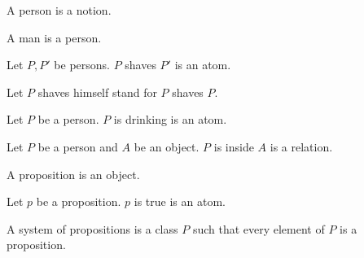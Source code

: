 \begin{forthel}
\end{forthel}

\begin{forthel}
  \begin{signature*}
    A person is a notion.
  \end{signature*}

  \begin{signature*}
    A man is a person.
  \end{signature*}

  \begin{signature*}
    Let $P, P'$ be persons.
    $P$ shaves $P'$ is an atom.
  \end{signature*}

  Let $P$ shaves himself stand for $P$ shaves $P$.

  \begin{signature*}
    Let $P$ be a person.
    $P$ is drinking is an atom.
  \end{signature*}

  \begin{signature*}
    Let $P$ be a person and $A$ be an object.
    $P$ is inside $A$ is a relation.
  \end{signature*}

  \begin{signature*}
    A proposition is an object.
  \end{signature*}

  \begin{signature*}
    Let $p$ be a proposition.
    $p$ is true is an atom.
  \end{signature*}

  \begin{definition*}
    A system of propositions is a class $P$ such that every element of $P$ is a proposition.
  \end{definition*}
\end{forthel}
